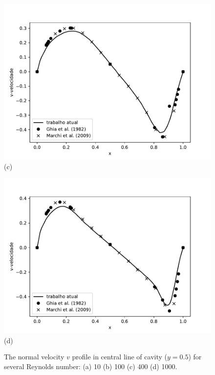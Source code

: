 \begin{figure}[H]
\begin{minipage}{.5\linewidth}
      \centering
      \includegraphics[scale=0.53]{./02_chaps/cap_validation/figure/Re_400_v_profile.pdf}\\
      (c)
     \end{minipage}%
     \begin{minipage}{.5\linewidth}
      \centering
      \includegraphics[scale=0.53]{./02_chaps/cap_validation/figure/Re_1000_v_profile.pdf}\\
      (d)
     \end{minipage}
     \medskip
     \caption{The normal velocity $v$ profile in central line of cavity ($y=0.5$) for several Reynolds number:
     (a) 10
     (b) 100
     (c) 400
     (d) 1000.}
     \label{velocity vy cavity}
\end{figure}


